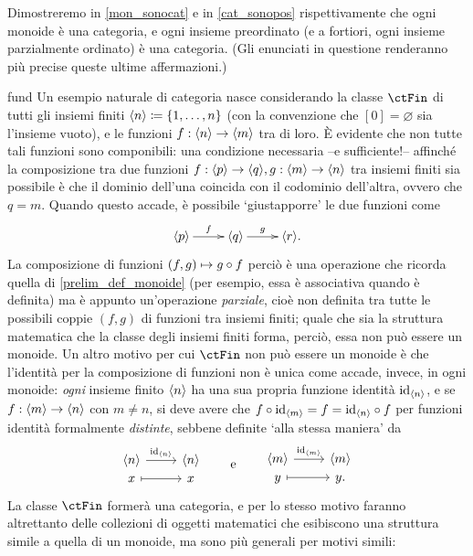 Dimostreremo in \ref{mon_sonocat} e in \ref{cat_sonopos} rispettivamente che ogni monoide è una categoria, e ogni insieme preordinato (e a fortiori, ogni insieme parzialmente ordinato) è una categoria. (Gli enunciati in questione renderanno più precise queste ultime affermazioni.)
\begin{hExample}{fund}\label{protoex_finset}
	Un esempio naturale di categoria nasce considerando la classe \(\ctFin\) di tutti gli insiemi finiti \(\bkt{n}\defeq \{\iter n\}\) (con la convenzione che \([0]=\varnothing\) sia l'insieme vuoto), e le funzioni \(f : \langle n\rangle \to \langle m\rangle\) tra di loro. \`E evidente che non tutte tali funzioni sono componibili: una condizione necessaria --e sufficiente!-- affinché la composizione tra due funzioni \(f : \langle p\rangle \to \langle q\rangle,g : \langle m\rangle \to \langle n\rangle\) tra insiemi finiti sia possibile è che il dominio dell'una coincida con il codominio dell'altra, ovvero che \(q=m\). Quando questo accade, è possibile `giustapporre' le due funzioni come
	\[\xymatrix{
			\bkt{p} \ar[r]^-f & \bkt{q} \ar[r]^-g & \bkt{r}.
		}\]
	La composizione di funzioni \((f,g)\mapsto g\circ f\) perciò è una operazione che ricorda quella di \ref{prelim_def_monoide} (per esempio, essa è associativa quando è definita) ma è appunto un'operazione \emph{parziale}, cioè non definita tra tutte le possibili coppie \((f,g)\) di funzioni tra insiemi finiti; quale che sia la struttura matematica che la classe degli insiemi finiti forma, perciò, essa non può essere un monoide. Un altro motivo per cui \(\ctFin\) non può essere un monoide è che l'identità per la composizione di funzioni non è unica come accade, invece, in ogni monoide: \emph{ogni} insieme finito \(\langle n\rangle\) ha una sua propria funzione identità \(\mathrm{id}_{\langle n\rangle}\), e se \(f : \langle m\rangle\to \langle n\rangle\) con \(m\ne n\), si deve avere che \(f\circ \mathrm{id}_{\langle m\rangle}=f=\mathrm{id}_{\langle n\rangle}\circ f\) per funzioni identità formalmente \emph{distinte}, sebbene definite `alla stessa maniera' da
	\[
		\begin{tikzcd}[row sep=0]
			{\bkt{n}} \ar{r}{\id_{\bkt{n}}} & {\bkt{n}} \\
			x \ar[mapsto]{r} & x
		\end{tikzcd}
		\qquad\mbox{e}\qquad
		\begin{tikzcd}[row sep=0]
			{\bkt{m}} \ar{r}{\id_{\bkt{m}}} & {\bkt{m}} \\
			y \ar[mapsto]{r} & y .
		\end{tikzcd}
	\]
	La classe \(\ctFin\) formerà una categoria, e per lo stesso motivo faranno altrettanto delle collezioni di oggetti matematici che esibiscono una struttura simile a quella di un monoide, ma sono più generali per motivi simili:

\end{hExample}
